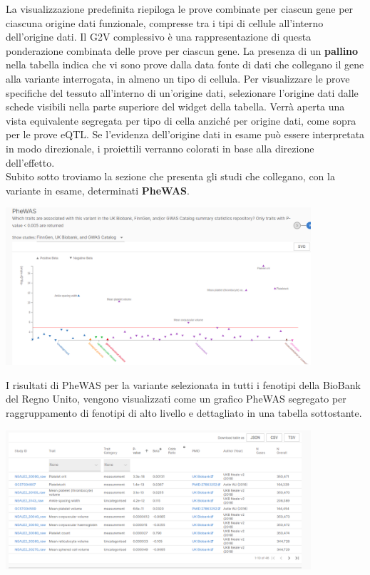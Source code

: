 \documentclass{article}
\begin{document}
La visualizzazione predefinita riepiloga le prove combinate per ciascun gene per ciascuna origine dati funzionale, compresse tra i tipi di cellule all'interno dell'origine dati. Il G2V complessivo è una rappresentazione di questa ponderazione combinata delle prove per ciascun gene. 
La presenza di un \textbf{pallino} nella tabella indica che vi sono prove dalla data fonte di dati che collegano il gene alla variante interrogata, in almeno un tipo di cellula.
Per visualizzare le prove specifiche del tessuto all'interno di un'origine dati, selezionare l'origine dati dalle schede visibili nella parte superiore del widget della tabella. Verrà aperta una vista equivalente segregata per tipo di cella anziché per origine dati, come sopra per le prove eQTL. Se l'evidenza dell'origine dati in esame può essere interpretata in modo direzionale, i proiettili verranno colorati in base alla direzione dell'effetto.\\
Subito sotto troviamo la sezione che presenta gli studi che collegano, con la variante in esame, determinati \textbf{PheWAS}. 
\begin{center}
    \includegraphics[width=0.85\textwidth]{figures/11-Variante.png}
\end{center}
I risultati di PheWAS per la variante selezionata in tutti i fenotipi della BioBank del Regno Unito, vengono visualizzati come un grafico PheWAS segregato per raggruppamento di fenotipi di alto livello e dettagliato in una tabella sottostante.\\
\begin{center}
    \includegraphics[width=0.85\textwidth]{figures/13-Variante.png}
\end{center}
\end{document}

